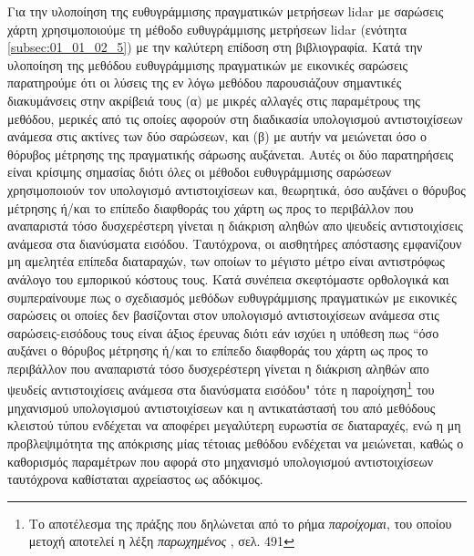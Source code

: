 Για την υλοποίηση της ευθυγράμμισης πραγματικών μετρήσεων lidar με σαρώσεις
χάρτη χρησιμοποιούμε τη μέθοδο ευθυγράμμισης μετρήσεων lidar (ενότητα
\ref{subsec:01_01_02_5}) με την καλύτερη επίδοση στη βιβλιογραφία. Κατά την
υλοποίηση της μεθόδου ευθυγράμμισης πραγματικών με εικονικές σαρώσεις
παρατηρούμε ότι οι λύσεις της εν λόγω μεθόδου παρουσιάζουν σημαντικές
διακυμάνσεις στην ακρίβειά τους (α) με μικρές αλλαγές στις παραμέτρους της
μεθόδου, μερικές από τις οποίες αφορούν στη διαδικασία υπολογισμού
αντιστοιχίσεων ανάμεσα στις ακτίνες των δύο σαρώσεων, και (β) με αυτήν να
μειώνεται όσο ο θόρυβος μέτρησης της πραγματικής σάρωσης αυξάνεται. Αυτές οι
δύο παρατηρήσεις είναι κρίσιμης σημασίας διότι όλες οι μέθοδοι ευθυγράμμισης
σαρώσεων χρησιμοποιούν τον υπολογισμό αντιστοιχίσεων και, θεωρητικά, όσο
αυξάνει ο θόρυβος μέτρησης ή/και το επίπεδο διαφθοράς του χάρτη ως προς το
περιβάλλον που αναπαριστά τόσο δυσχερέστερη γίνεται η διάκριση αληθών απο
ψευδείς αντιστοιχίσεις ανάμεσα στα διανύσματα εισόδου. Ταυτόχρονα, οι
αισθητήρες απόστασης εμφανίζουν μη αμελητέα επίπεδα διαταραχών, των οποίων το
μέγιστο μέτρο είναι αντιστρόφως ανάλογο του εμπορικού κόστους τους. Κατά
συνέπεια σκεφτόμαστε ορθολογικά και συμπεραίνουμε πως ο σχεδιασμός μεθόδων
ευθυγράμμισης πραγματικών με εικονικές σαρώσεις οι οποίες δεν βασίζονται στον
υπολογισμό αντιστοιχίσεων ανάμεσα στις σαρώσεις-εισόδους τους είναι άξιος
έρευνας διότι εάν ισχύει η υπόθεση πως ``όσο αυξάνει ο θόρυβος μέτρησης ή/και
το επίπεδο διαφθοράς του χάρτη ως προς το περιβάλλον που αναπαριστά τόσο
δυσχερέστερη γίνεται η διάκριση αληθών απο ψευδείς αντιστοιχίσεις ανάμεσα στα
διανύσματα εισόδου" τότε η παροίχηση\footnote{Το αποτέλεσμα της πράξης που
δηλώνεται από το ρήμα \textit{παροίχομαι}, του οποίου μετοχή αποτελεί η λέξη
\textit{παρωχημένος} \cite{liddell_scott}, σελ. 491} του μηχανισμού υπολογισμού
αντιστοιχίσεων και η αντικατάστασή του από μεθόδους κλειστού τύπου ενδέχεται να
αποφέρει μεγαλύτερη ευρωστία σε διαταραχές, ενώ η μη προβλεψιμότητα της
απόκρισης μίας τέτοιας μεθόδου ενδέχεται να μειώνεται, καθώς ο καθορισμός
παραμέτρων που αφορά στο μηχανισμό υπολογισμού αντιστοιχίσεων ταυτόχρονα
καθίσταται αχρείαστος ως αδόκιμος.\\


